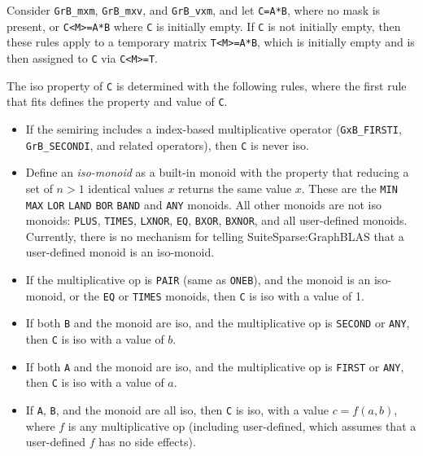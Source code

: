 Consider \verb'GrB_mxm', \verb'GrB_mxv', and \verb'GrB_vxm', and
    let \verb'C=A*B', where no mask is present, or \verb'C<M>=A*B' where
    \verb'C' is initially empty.  If \verb'C' is not initially empty,
    then these rules apply to a temporary matrix \verb'T<M>=A*B', which is
    initially empty and is then assigned to \verb'C' via \verb'C<M>=T'.

    The iso property of \verb'C' is determined with the following rules,
    where the first rule that fits defines the property and value of \verb'C'.

    \begin{itemize}
    \item If the semiring includes a index-based multiplicative operator
    (\verb'GxB_FIRSTI', \verb'GrB_SECONDI', and related operators), then
    \verb'C' is never iso.

    \item Define an {\em iso-monoid} as a built-in monoid with the property
    that reducing a set of $n>1$ identical values $x$ returns the same value
    $x$.  These are the \verb'MIN' \verb'MAX' \verb'LOR' \verb'LAND' \verb'BOR'
    \verb'BAND' and \verb'ANY' monoids.  All other monoids are not iso monoids:
    \verb'PLUS', \verb'TIMES', \verb'LXNOR', \verb'EQ', \verb'BXOR',
    \verb'BXNOR', and all user-defined monoids.   Currently, there is no
    mechanism for telling SuiteSparse:GraphBLAS that a user-defined monoid
    is an iso-monoid.

    \item If the multiplicative op is \verb'PAIR' (same as \verb'ONEB'),
    and the monoid is an
    iso-monoid, or the \verb'EQ' or \verb'TIMES' monoids, then \verb'C' is
    iso with a value of 1.

    \item If both \verb'B' and the monoid are iso, and the multiplicative op is
    \verb'SECOND' or \verb'ANY', then \verb'C' is iso with a value of $b$.

    \item If both \verb'A' and the monoid are iso, and the multiplicative op is
    \verb'FIRST' or \verb'ANY', then \verb'C' is iso with a value of $a$.

    \item If \verb'A', \verb'B', and the monoid are all iso, then \verb'C'
    is iso, with a value $c=f(a,b)$, where $f$ is any multiplicative op
    (including user-defined, which assumes that a user-defined $f$ has no
    side effects).


\end{itemize}
